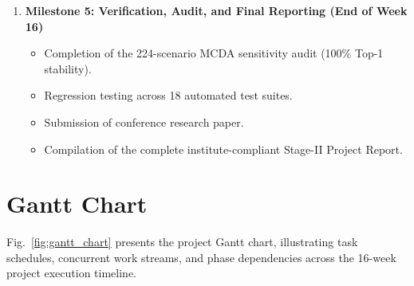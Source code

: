 \begin{enumerate}
    \item \textbf{Milestone 5: Verification, Audit, and Final Reporting (End of Week 16)}
    \begin{itemize}
        \item Completion of the 224-scenario MCDA sensitivity audit (100\% Top-1 stability).
        \item Regression testing across 18 automated test suites.
        \item Submission of conference research paper.
        \item Compilation of the complete institute-compliant Stage-II Project Report.
    \end{itemize}
\end{enumerate}

\section{Gantt Chart}
\label{sec:gantt_chart}

Fig.~\ref{fig:gantt_chart} presents the project Gantt chart, illustrating task schedules, concurrent work streams, and phase dependencies across the 16-week project execution timeline.

